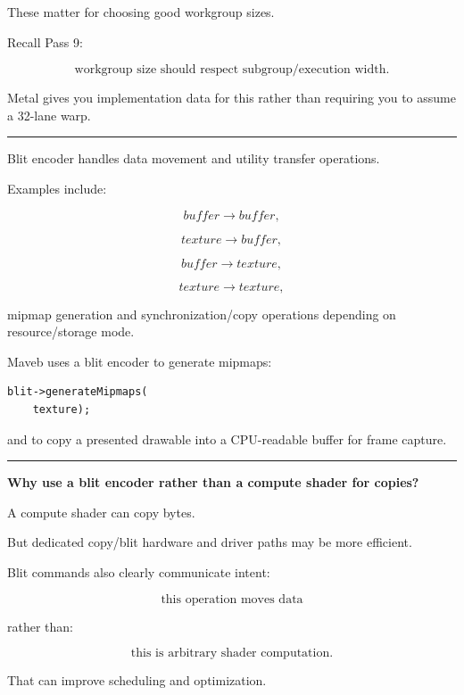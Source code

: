 These matter for choosing good workgroup sizes.

Recall Pass 9:

\[
\boxed{
\text{workgroup size should respect subgroup/execution width}.
}
\]

Metal gives you implementation data for this rather than requiring you to assume a 32-lane warp.

\begin{center}\rule{0.5\linewidth}{0.5pt}\end{center}

\textbf{}

Blit encoder handles data movement and utility transfer operations.

Examples include:

\[
buffer\rightarrow buffer,
\]

\[
texture\rightarrow buffer,
\]

\[
buffer\rightarrow texture,
\]

\[
texture\rightarrow texture,
\]

mipmap generation and synchronization/copy operations depending on resource/storage mode.

Maveb uses a blit encoder to generate mipmaps:

\begin{verbatim}
blit->generateMipmaps(
    texture);
\end{verbatim}

and to copy a presented drawable into a CPU-readable buffer for frame capture.

\begin{center}\rule{0.5\linewidth}{0.5pt}\end{center}

\textbf{Why use a blit encoder rather than a compute shader for copies?}

A compute shader can copy bytes.

But dedicated copy/blit hardware and driver paths may be more efficient.

Blit commands also clearly communicate intent:

\[
\boxed{
\text{this operation moves data}
}
\]

rather than:

\[
\text{this is arbitrary shader computation}.
\]

That can improve scheduling and optimization.

